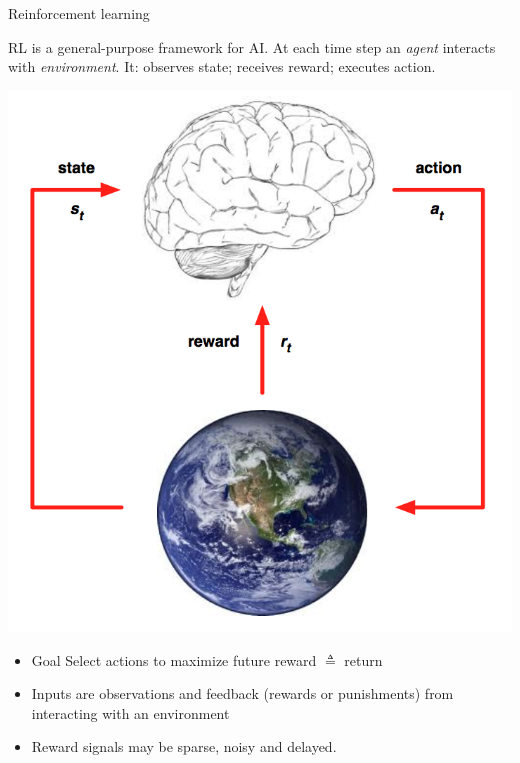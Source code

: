 \documentclass[11pt,compress,t,notes=noshow, xcolor=table]{beamer}
\begin{document}
\begin{vbframe}{Reinforcement learning}

RL is a general-purpose framework for AI.
At each time step an \emph{agent} interacts with \emph{environment}. 
It: observes state; receives reward; executes action.

\begin{center}
  \includegraphics[height=0.4\textheight,keepaspectratio]{figure_man/state_action_reward_diagram.png}
\end{center}


\begin{itemize}
\item Goal Select actions to maximize future reward $\triangleq$ return
 \item Inputs are observations and feedback (rewards or punishments) from
  interacting with an environment
\item Reward signals may be sparse, noisy and delayed.
\end{itemize}

\end{vbframe}
\end{document}
